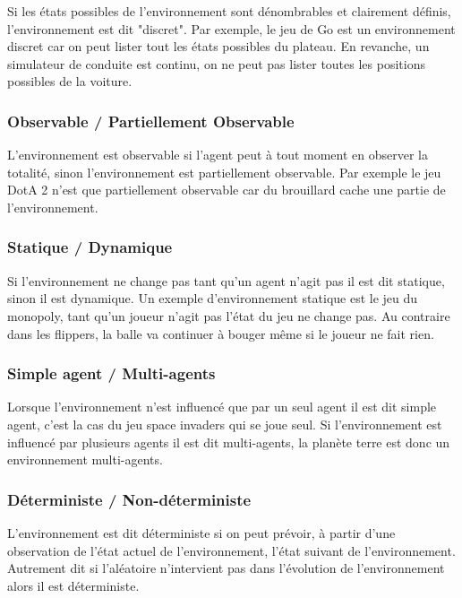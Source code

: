 \documentclass{article}
\begin{document}
Si les états possibles de l'environnement sont dénombrables et clairement définis, l'environnement est dit "discret". Par exemple, le jeu de Go est un environnement discret car on peut lister tout les états possibles du plateau. En revanche, un simulateur de conduite est continu, on ne peut pas lister toutes les positions possibles de la voiture\cite{tutoptai}.

\subsubsection{Observable / Partiellement Observable}

L'environnement est observable si l'agent peut à tout moment en observer la totalité, sinon l'environnement est partiellement observable. Par exemple le jeu DotA 2 n'est que partiellement observable car du brouillard cache une partie de l'environnement\cite{tutoptai}.

\subsubsection{Statique / Dynamique}

Si l'environnement ne change pas tant qu'un agent n'agit pas il est dit statique, sinon il est dynamique. Un exemple d'environnement statique est le jeu du monopoly, tant qu'un joueur n'agit pas l'état du jeu ne change pas. Au contraire dans les flippers, la balle va continuer à bouger même si le joueur ne fait rien\cite{tutoptai}.

\subsubsection{Simple agent / Multi-agents}

Lorsque l'environnement n'est influencé que par un seul agent il est dit simple agent, c'est la cas du jeu space invaders qui se joue seul. Si l'environnement est influencé par plusieurs agents il est dit multi-agents, la planète terre est donc un environnement multi-agents\cite{tutoptai}.

\subsubsection{Déterministe / Non-déterministe}

L'environnement est dit déterministe si on peut prévoir, à partir d'une observation de l'état actuel de l'environnement, l'état suivant de l'environnement. Autrement dit si l'aléatoire n'intervient pas dans l'évolution de l'environnement alors il est déterministe\cite{tutoptai}.
\end{document}
